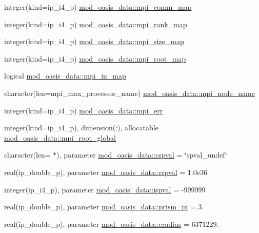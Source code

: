 \begin{DoxyCompactItemize}
\item 
integer(kind=ip\+\_\+i4\+\_\+p) \hyperlink{namespacemod__oasis__data_a8ff971286c1f235b8a328b3298f58a9b}{mod\+\_\+oasis\+\_\+data\+::mpi\+\_\+comm\+\_\+map}
\item 
integer(kind=ip\+\_\+i4\+\_\+p) \hyperlink{namespacemod__oasis__data_a5e29025a6d83c7a01f88febbb734b7e9}{mod\+\_\+oasis\+\_\+data\+::mpi\+\_\+rank\+\_\+map}
\item 
integer(kind=ip\+\_\+i4\+\_\+p) \hyperlink{namespacemod__oasis__data_ac4a6f10dab1d3078f8467465c21b9fdd}{mod\+\_\+oasis\+\_\+data\+::mpi\+\_\+size\+\_\+map}
\item 
integer(kind=ip\+\_\+i4\+\_\+p) \hyperlink{namespacemod__oasis__data_a177c2b47ae4c69407d55817cd468b0ae}{mod\+\_\+oasis\+\_\+data\+::mpi\+\_\+root\+\_\+map}
\item 
logical \hyperlink{namespacemod__oasis__data_a799f6f0a442fcc2ab9960814b8b1b74a}{mod\+\_\+oasis\+\_\+data\+::mpi\+\_\+in\+\_\+map}
\item 
character(len=mpi\+\_\+max\+\_\+processor\+\_\+name) \hyperlink{namespacemod__oasis__data_ad186b77d375be587e4f198ca45026d2e}{mod\+\_\+oasis\+\_\+data\+::mpi\+\_\+node\+\_\+name}
\item 
integer(kind=ip\+\_\+i4\+\_\+p) \hyperlink{namespacemod__oasis__data_abd48a08a17f07ec656912d9b2b7b7922}{mod\+\_\+oasis\+\_\+data\+::mpi\+\_\+err}
\item 
integer(kind=ip\+\_\+i4\+\_\+p), dimension(\+:), allocatable \hyperlink{namespacemod__oasis__data_a7f03d4afc0c91a42b13ddcf7ec082e51}{mod\+\_\+oasis\+\_\+data\+::mpi\+\_\+root\+\_\+global}
\item 
character(len= $\ast$), parameter \hyperlink{namespacemod__oasis__data_acfb160b3d147e7cb667b0dc0f5bb2960}{mod\+\_\+oasis\+\_\+data\+::cspval} = \char`\"{}spval\+\_\+undef\char`\"{}
\item 
real(ip\+\_\+double\+\_\+p), parameter \hyperlink{namespacemod__oasis__data_a3fea2837639caadabd693f405693edbb}{mod\+\_\+oasis\+\_\+data\+::rspval} = 1.\+0e36
\item 
integer(ip\+\_\+i4\+\_\+p), parameter \hyperlink{namespacemod__oasis__data_a66bd35eca1454b6d8c8ac0449f2ca475}{mod\+\_\+oasis\+\_\+data\+::ispval} = -\/999999
\item 
real(ip\+\_\+double\+\_\+p), parameter \hyperlink{namespacemod__oasis__data_ad5c84ea4b3063c2a3883b6d6571afeb0}{mod\+\_\+oasis\+\_\+data\+::prism\+\_\+pi} = 3.
\item 
real(ip\+\_\+double\+\_\+p), parameter \hyperlink{namespacemod__oasis__data_a7f361db125e5554d0427e964b698f10c}{mod\+\_\+oasis\+\_\+data\+::eradius} = 6371229.
\end{DoxyCompactItemize}
